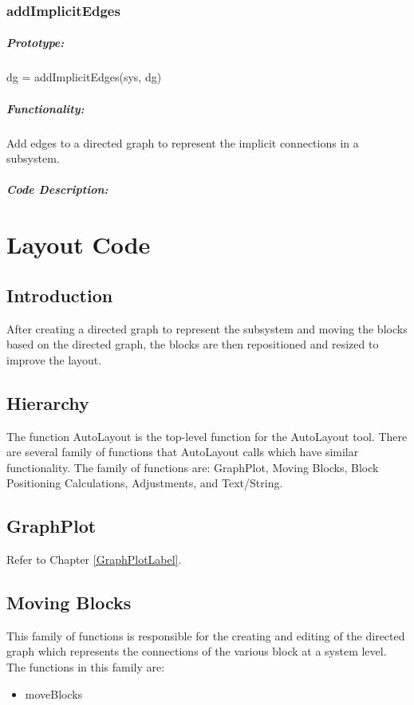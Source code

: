 \documentclass[12pt,letterpaper]{report}
\begin{document}
\subsection{addImplicitEdges}
\paragraph{Prototype:} dg = addImplicitEdges(sys, dg)
\paragraph{Functionality:} Add edges to a directed graph to represent the implicit connections in a subsystem.
\paragraph{Code Description:}

\chapter{Layout Code}

\section{Introduction}
\par After creating a directed graph to represent the subsystem and moving the blocks based on the directed graph, the blocks are then repositioned and resized to improve the layout.

\section{Hierarchy}
\par The function AutoLayout is the top-level function for the AutoLayout tool. There are several family of functions that AutoLayout calls which have similar functionality. The family of functions are: GraphPlot, Moving Blocks, Block Positioning Calculations, Adjustments, and Text/String.

\section{GraphPlot}
\par Refer to Chapter \ref{GraphPlotLabel}.


\section{Moving Blocks}
\par This family of functions is responsible for the creating and editing of the directed graph which represents the connections of the various block at a system level. The functions in this family are:
\begin{itemize}
	\item moveBlocks
\end{itemize}
\end{document}
